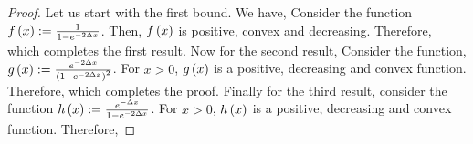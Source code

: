 \begin{proof}
Let us start with the first bound. We have, 
Consider the function $f\left(x\right) := \frac{1}{1-e^{-2\Delta x}}$. Then, $f\left(x\right)$ is positive, convex and decreasing. Therefore, 
which completes the first result. Now for the second result, 
Consider the function, $g\left(x\right) := \frac{e^{-2\Delta x}}{\left(1-e^{-2\Delta x}\right)^{2}}$. For $x > 0$, $g\left(x\right)$ is a positive, decreasing and convex function. Therefore, 
which completes the proof. Finally for the third result, consider the function $h\left(x\right) := \frac{e^{-\Delta x}}{1-e^{-2\Delta x}}$. For $x > 0$, $h\left(x\right)$ is a positive, decreasing and convex function. Therefore, 


\end{proof}
